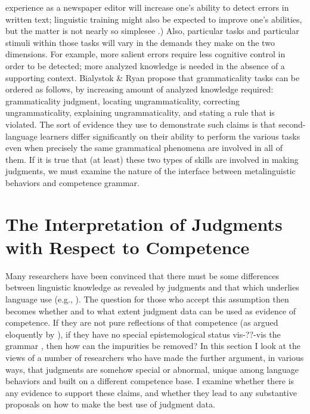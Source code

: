  experience as a newspaper editor will increase one's ability to detect errors in written text; linguistic training might also be expected to improve one's abilities, but the matter is not nearly so simple\schdash{}see .) Also, particular tasks and particular stimuli within those tasks will vary in the demands they make on the two dimensions. For example, more salient errors require less cognitive control in order to be detected; more analyzed knowledge is needed in the absence of a supporting context. Bialystok \& Ryan propose that grammaticality tasks can be ordered as follows, by increasing amount of analyzed knowledge required: grammaticality judgment, locating ungrammaticality, correcting ungrammaticality, explaining ungrammaticality, and stating a rule that is violated. The sort of evidence they use to demonstrate such claims is that second-language learners differ significantly on their ability to perform the various tasks even when precisely the same grammatical phenomena are involved in all of them. If it is true that (at least) these two types of skills are involved in making judgments, we must examine the nature of the interface between metalinguistic behaviors and competence grammar.


\section{The Interpretation of Judgments with Respect to Competence}\label{sec:3.5}

Many researchers have been convinced that there must be some differences between linguistic knowledge as revealed by judgments and that which underlies language use (e.g., \citet{CardenEtAl1981}). The question for those who accept this assumption then becomes whether and to what extent judgment data can be used as evidence of competence. If they are not pure reflections of that competence (as argued eloquently by \citet[vol. 3: 5\textendash{}7]{Levelt1974}), if they have no special epistemological status vis-??-vis the grammar \citep{LeveltEtAl1978}, then how can the impurities be removed? In this section I look at the views of a number of researchers who have made the further argument, in various ways, that judgments are somehow special or abnormal, unique among language behaviors and built on a different competence base. I examine whether there is any evidence to support these claims, and whether they lead to any substantive proposals on how to make the best use of judgment data.

